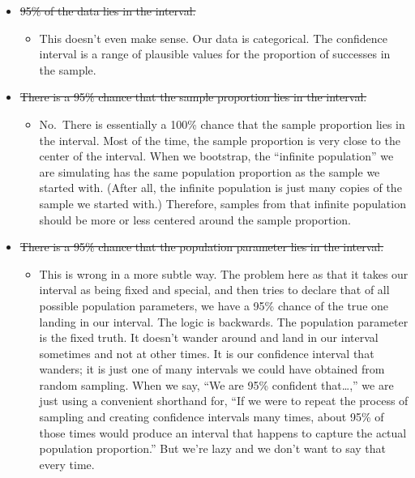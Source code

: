 \documentclass[
]{book}
\providecommand{\tightlist}{%
  \setlength{\itemsep}{0pt}\setlength{\parskip}{0pt}}
\begin{document}
\begin{itemize}
\tightlist
\item
  \sout{95\% of the data lies in the interval.}

  \begin{itemize}
  \tightlist
  \item
    This doesn't even make sense. Our data is categorical. The confidence interval is a range of plausible values for the proportion of successes in the sample.
  \end{itemize}
\item
  \sout{There is a 95\% chance that the sample proportion lies in the interval.}

  \begin{itemize}
  \tightlist
  \item
    No.~There is essentially a 100\% chance that the sample proportion lies in the interval. Most of the time, the sample proportion is very close to the center of the interval. When we bootstrap, the ``infinite population'' we are simulating has the same population proportion as the sample we started with. (After all, the infinite population is just many copies of the sample we started with.) Therefore, samples from that infinite population should be more or less centered around the sample proportion.
  \end{itemize}
\item
  \sout{There is a 95\% chance that the population parameter lies in the interval.}

  \begin{itemize}
  \tightlist
  \item
    This is wrong in a more subtle way. The problem here as that it takes our interval as being fixed and special, and then tries to declare that of all possible population parameters, we have a 95\% chance of the true one landing in our interval. The logic is backwards. The population parameter is the fixed truth. It doesn't wander around and land in our interval sometimes and not at other times. It is our confidence interval that wanders; it is just one of many intervals we could have obtained from random sampling. When we say, ``We are 95\% confident that\ldots,'' we are just using a convenient shorthand for, ``If we were to repeat the process of sampling and creating confidence intervals many times, about 95\% of those times would produce an interval that happens to capture the actual population proportion.'' But we're lazy and we don't want to say that every time.
  \end{itemize}
\end{itemize}
\end{document}
